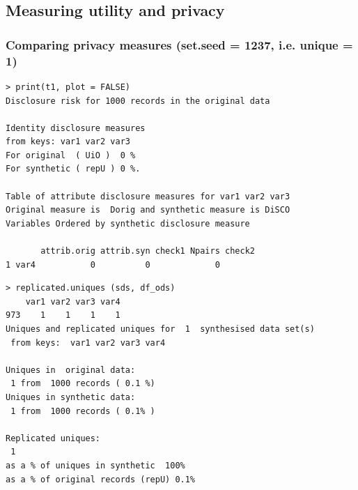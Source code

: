 \documentclass[t,8pt,utfx8]{beamer}
\begin{document}
\begin{spacing}{1.25}
\section{Measuring utility and privacy}\label{sec:measuring}


\begin{frame}[fragile]
\frametitle{Comparing privacy measures (set.seed = 1237, i.e. unique = 1)}
  


\begin{minipage}[t]{0.48\textwidth}
\begin{lstlisting}
> print(t1, plot = FALSE)
Disclosure risk for 1000 records in the original data

Identity disclosure measures
from keys: var1 var2 var3 
For original  ( UiO )  0 %
For synthetic ( repU ) 0 %.

Table of attribute disclosure measures for var1 var2 var3 
Original measure is  Dorig and synthetic measure is DiSCO 
Variables Ordered by synthetic disclosure measure

       attrib.orig attrib.syn check1 Npairs check2
1 var4           0          0             0     
\end{lstlisting}
\end{minipage}%
  \hfill%
\begin{minipage}[t]{0.48\textwidth}
\begin{lstlisting}
> replicated.uniques (sds, df_ods)
    var1 var2 var3 var4
973    1    1    1    1
Uniques and replicated uniques for  1  synthesised data set(s)
 from keys:  var1 var2 var3 var4 

Uniques in  original data:
 1 from  1000 records ( 0.1 %) 
Uniques in synthetic data:
 1 from  1000 records ( 0.1% )

Replicated uniques:
 1
as a % of uniques in synthetic  100%
as a % of original records (repU) 0.1%
\end{lstlisting}
\end{minipage}
\end{frame}


\end{spacing}
\end{document}
